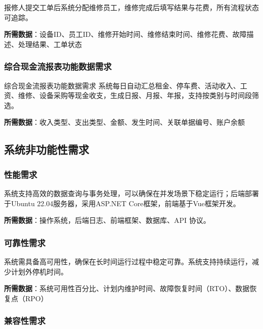 \documentclass[]{article}
\begin{document}
报修人提交工单后系统分配维修员工，维修完成后填写结果与花费，所有流程状态可追踪。

\textbf{所需数据}：设备ID、员工ID、维修开始时间、维修结束时间、维修花费、故障描述、处理结果、工单状态

\hypertarget{ux7efcux5408ux73b0ux91d1ux6d41ux62a5ux8868ux529fux80fdux6570ux636eux9700ux6c42}{%
\subsubsection{综合现金流报表功能数据需求}\label{ux7efcux5408ux73b0ux91d1ux6d41ux62a5ux8868ux529fux80fdux6570ux636eux9700ux6c42}}

综合现金流报表功能数据需求
系统每日自动汇总租金、停车费、活动收入、工资、维修、设备采购等现金收支，生成日报、月报、年报，支持按类别与时间段筛选。

\textbf{所需数据}：收入类型、支出类型、金额、发生时间、关联单据编号、账户余额

\hypertarget{ux7cfbux7edfux975eux529fux80fdux6027ux9700ux6c42}{%
\subsection{系统非功能性需求}\label{ux7cfbux7edfux975eux529fux80fdux6027ux9700ux6c42}}

\hypertarget{ux6027ux80fdux9700ux6c42}{%
\subsubsection{性能需求}\label{ux6027ux80fdux9700ux6c42}}

系统支持高效的数据查询与事务处理，可以确保在并发场景下稳定运行；后端部署于Ubuntu
22.04服务器，采用ASP.NET Core框架，前端基于Vue框架开发。

\textbf{所需数据}：操作系统，后端日志、前端框架、数据库、API 协议。

\hypertarget{ux53efux9760ux6027ux9700ux6c42}{%
\subsubsection{可靠性需求}\label{ux53efux9760ux6027ux9700ux6c42}}

系统需具备高可用性，确保在长时间运行过程中稳定可靠。系统支持持续运行，减少计划外停机时间。

\textbf{所需数据}：系统可用性百分比、计划内维护时间、故障恢复时间（RTO）、数据恢复点（RPO）

\hypertarget{ux517cux5bb9ux6027ux9700ux6c42}{%
\subsubsection{兼容性需求}\label{ux517cux5bb9ux6027ux9700ux6c42}}
\end{document}
